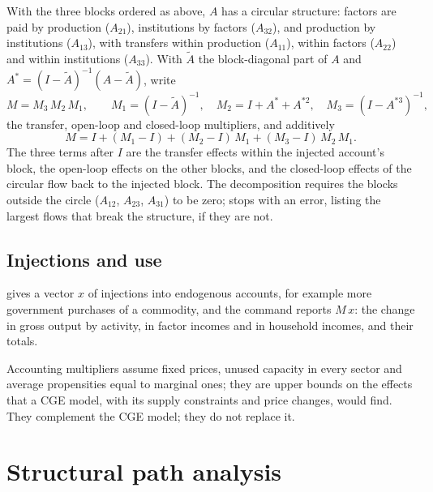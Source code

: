 With the three blocks ordered as above, $A$ has a circular structure: factors
are paid by production ($A_{21}$), institutions by factors ($A_{32}$), and
production by institutions ($A_{13}$), with transfers within production
($A_{11}$), within factors ($A_{22}$) and within institutions ($A_{33}$). With
$\tilde A$ the block-diagonal part of $A$ and $A^* = (I - \tilde A)^{-1}(A -
\tilde A)$, \citet{pyatt1979} write
\begin{equation*}
M = M_3\,M_2\,M_1, \qquad M_1 = (I - \tilde A)^{-1}, \quad M_2 = I + A^* + A^{*2},
\quad M_3 = (I - A^{*3})^{-1},
\end{equation*}
the transfer, open-loop and closed-loop multipliers, and additively
\begin{equation*}
M = I + (M_1 - I) + (M_2 - I)\,M_1 + (M_3 - I)\,M_2\,M_1 .
\end{equation*}
The three terms after $I$ are the transfer effects within the injected
account's block, the open-loop effects on the other blocks, and the closed-loop
effects of the circular flow back to the injected block. The decomposition
requires the blocks outside the circle ($A_{12}$, $A_{23}$, $A_{31}$) to be
zero;  stops with an error, listing the largest flows that break
the structure, if they are not.

\subsection{Injections and use}

 gives a vector $x$ of injections into endogenous accounts, for
example more government purchases of a commodity, and the command reports
$M\,x$: the change in gross output by activity, in factor incomes and in
household incomes, and their totals.

Accounting multipliers assume fixed prices, unused capacity in every sector and
average propensities equal to marginal ones; they are upper bounds on the
effects that a CGE model, with its supply constraints and price changes, would
find. They complement the CGE model; they do not replace it.

\section{Structural path analysis}\label{sec:spa}

